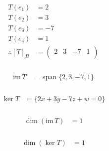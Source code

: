 \documentclass[fleqn, a4paper]{amsart}
\DeclareMathOperator{\vspan}{\mathrm{span}} %
\theoremstyle{definition}
\theoremstyle{theorem}
\theoremstyle{remark}
\newcommand{\im}{\mathrm{im}\,}
\numberwithin{corollary}{theorem}
\numberwithin{equation}{theorem}
\begin{document}
\begin{multicols}{1}
\subsubsection{}

\begin{align*}
	T(e_1) &= 2\\
	T(e_2) &= 3\\
	T(e_3) &= -7\\
	T(e_4) &= 1\\
	\therefore [T]_B &= 
		\begin{pmatrix}
			2 & 3 & -7 & 1\\
		\end{pmatrix}
\end{align*}

\subsubsection{}

\begin{align*}
	\im T &= \vspan\{2, 3, -7, 1\}
\end{align*}

\subsubsection{}

\begin{align*}
	\ker T &= \{2x + 3y - 7z + w = 0\}
\end{align*}

\subsubsection{}

\begin{align*}
	\dim (\im T) &= 1
\end{align*}

\subsubsection{}

\begin{align*}
	\dim (\ker T) &= 1
\end{align*}

\end{multicols}
\end{document}
